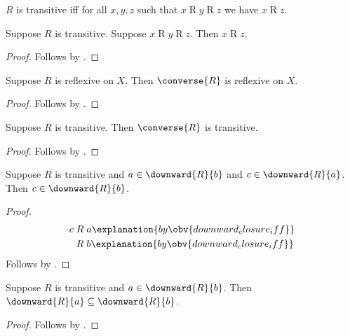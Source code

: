 \begin{definition}[Transitivity]\label{transitive}
    $R$ is transitive iff
    for all $x, y, z$ such that $x\mathrel{R}y\mathrel{R}z$
        we have $x\mathrel{R} z$.
\end{definition}

\begin{composition}\label{transitive_relation_composition}
    Suppose $R$ is transitive.
    Suppose $x\mathrel{R}y\mathrel{R}z$.
    Then $x\mathrel{R}z$.
\end{composition}
\begin{proof}
    Follows by .
\end{proof}

\begin{proposition}\label{converse_reflexive_on}
    Suppose $R$ is reflexive on $X$.
    Then $\converse{R}$ is reflexive on $X$.
\end{proposition}
\begin{proof}
    Follows by .
\end{proof}

\begin{proposition}\label{converse_transitive}
    Suppose $R$ is transitive.
    Then $\converse{R}$ is transitive.
\end{proposition}
\begin{proof}
    Follows by .
\end{proof}

\begin{proposition}\label{transitive_downward_elem}
    Suppose $R$ is transitive and $a\in\downward{R}{b}$ and
        $c\in\downward{R}{a}$.
    Then $c\in \downward{R}{b}$.
\end{proposition}
\begin{proof}
    \begin{align*}
        c
            &\mathrel{R} a
                \explanation{by \obv{downward_closure_iff}}
                \\
            &\mathrel{R} b
                \explanation{by \obv{downward_closure_iff}}
    \end{align*}
    Follows by .
\end{proof}

\begin{proposition}\label{transitive_downward_subseteq}
    Suppose $R$ is transitive and $a\in\downward{R}{b}$.
    Then $\downward{R}{a}\subseteq \downward{R}{b}$.
\end{proposition}
\begin{proof}
    Follows by .
\end{proof}

